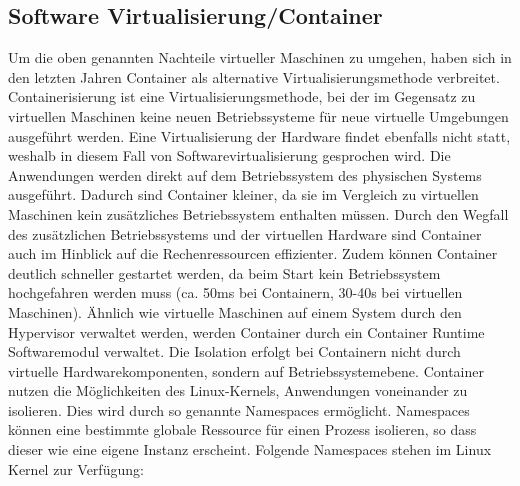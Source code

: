 \subsection{Software Virtualisierung/Container}
\label{Software Virtualisierung/Container}
Um die oben genannten Nachteile virtueller Maschinen zu umgehen, haben sich in den letzten Jahren Container als alternative Virtualisierungsmethode verbreitet. Containerisierung ist eine Virtualisierungsmethode, bei der im Gegensatz zu virtuellen Maschinen keine neuen Betriebssysteme für neue virtuelle Umgebungen ausgeführt werden. Eine Virtualisierung der Hardware findet ebenfalls nicht statt, weshalb in diesem Fall von Softwarevirtualisierung gesprochen wird. Die Anwendungen werden direkt auf dem Betriebssystem des physischen Systems ausgeführt. Dadurch sind Container kleiner, da sie im Vergleich zu virtuellen Maschinen kein zusätzliches Betriebssystem enthalten müssen. Durch den Wegfall des zusätzlichen Betriebssystems und der virtuellen Hardware sind Container auch im Hinblick auf die Rechenressourcen effizienter. Zudem können Container deutlich schneller gestartet werden, da beim Start kein Betriebssystem hochgefahren werden muss (ca. 50ms bei Containern, 30-40s bei virtuellen Maschinen). \cite{Martin2018} Ähnlich wie virtuelle Maschinen auf einem System durch den Hypervisor verwaltet werden, werden Container durch ein Container Runtime Softwaremodul verwaltet. Die Isolation erfolgt bei Containern nicht durch virtuelle Hardwarekomponenten, sondern auf Betriebssystemebene. Container nutzen die Möglichkeiten des Linux-Kernels, Anwendungen voneinander zu isolieren. Dies wird durch so genannte Namespaces ermöglicht. Namespaces können eine bestimmte globale Ressource für einen Prozess isolieren, so dass dieser wie eine eigene Instanz erscheint. Folgende Namespaces stehen im Linux Kernel zur Verfügung:
